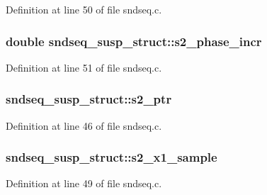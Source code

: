 Definition at line 50 of file sndseq.\+c.

\subsubsection[{\texorpdfstring{s2\+\_\+phase\+\_\+incr}{s2_phase_incr}}]{\setlength{\rightskip}{0pt plus 5cm}double sndseq\+\_\+susp\+\_\+struct\+::s2\+\_\+phase\+\_\+incr}\hypertarget{structsndseq__susp__struct_a049976a5eca9c1199900485f96b8da2a}{}\label{structsndseq__susp__struct_a049976a5eca9c1199900485f96b8da2a}


Definition at line 51 of file sndseq.\+c.

\subsubsection[{\texorpdfstring{s2\+\_\+ptr}{s2_ptr}}]{ sndseq\+\_\+susp\+\_\+struct\+::s2\+\_\+ptr}\hypertarget{structsndseq__susp__struct_a89610d179e4eb86db8cbe65068412ec9}{}\label{structsndseq__susp__struct_a89610d179e4eb86db8cbe65068412ec9}


Definition at line 46 of file sndseq.\+c.

\subsubsection[{\texorpdfstring{s2\+\_\+x1\+\_\+sample}{s2_x1_sample}}]{ sndseq\+\_\+susp\+\_\+struct\+::s2\+\_\+x1\+\_\+sample}\hypertarget{structsndseq__susp__struct_a0144b74e520a337f8225b38b06e19c3f}{}\label{structsndseq__susp__struct_a0144b74e520a337f8225b38b06e19c3f}


Definition at line 49 of file sndseq.\+c.

